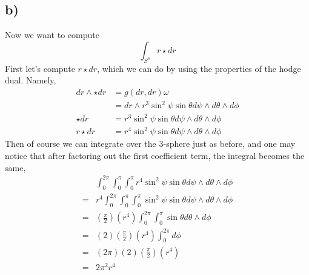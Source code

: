 \documentclass{article}
\theoremstyle{definition}
\begin{document}
\subsection*{b)}
Now we want to compute 
\[
    \int_{S^3} r \star dr
\]
First let's compute $r \star dr$, which we can do by using the properties of the hodge dual. Namely,
\begin{align*}
    dr \wedge \star dr &= g(dr, dr) \omega \\
    &= dr \wedge r^3 \sin^2\psi \sin \theta d\psi \wedge d\theta \wedge d\phi \\
    \star dr &= r^3 \sin^2\psi \sin \theta d\psi \wedge d\theta \wedge d\phi \\
    r \star dr &= r^4 \sin^2\psi \sin \theta d\psi \wedge d\theta \wedge d\phi 
\end{align*}
Then of course we can integrate over the 3-sphere just as before, and one may notice that after factoring out the first
coefficient term, the integral becomes the same,
\begin{align*}
    & \int_0^{2\pi} \int_0^\pi \int_0^\pi r^4 \sin^2 \psi \sin \theta d\psi \wedge d\theta \wedge d\phi \\
    =& r^4 \int_0^{2\pi} \int_0^\pi \int_0^\pi \sin^2 \psi \sin \theta d\psi \wedge d\theta \wedge d\phi \\
    =& \left(\frac{\pi}{2}\right)\left(r^4\right) \int_0^{2\pi} \int_0^\pi \sin \theta d\theta \wedge d\phi \\
    =& (2)\left(\frac{\pi}{2}\right)\left(r^4\right) \int_0^{2\pi} d\phi \\
    =& (2\pi)(2)\left(\frac{\pi}{2}\right)\left(r^4\right) \\
    =& 2\pi^2 r^4
\end{align*}
\end{document}
